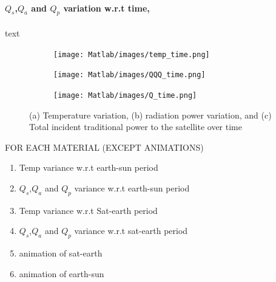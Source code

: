\documentclass[11pt]{article}
\begin{document}
\paragraph{$Q_{s}$,$Q_{a}$ and $Q_{p}$ variation w.r.t time,}
text

\begin{figure}[H]
    \centering
    \begin{subfigure}[b]{1\textwidth}
        \texttt{[image: Matlab/images/temp\_time.png]}
        \caption{}
        \label{fig:temptime}
    \end{subfigure}
    \begin{subfigure}[b]{1\textwidth}
        \texttt{[image: Matlab/images/QQQ\_time.png]}
        \caption{}
        \label{fig:temptime}
    \end{subfigure}
    \begin{subfigure}[b]{1\textwidth}
        \texttt{[image: Matlab/images/Q\_time.png]}
        \caption{}
        \label{fig:temptime}
    \end{subfigure}
    \caption{(a) Temperature variation, (b) radiation power variation, and (c) Total incident traditional power to the satellite over time}
\end{figure}







 
FOR EACH MATERIAL (EXCEPT ANIMATIONS)
\begin{enumerate}
    \item Temp variance w.r.t earth-sun period
    \item $Q_{s}$,$Q_{a}$ and $Q_{p}$ variance w.r.t earth-sun period
    \item Temp variance w.r.t Sat-earth period
    \item $Q_{s}$,$Q_{a}$ and $Q_{p}$ variance w.r.t sat-earth period
    \item animation of sat-earth
    \item animation of earth-sun 


\end{enumerate}


\newpage
\end{document}
